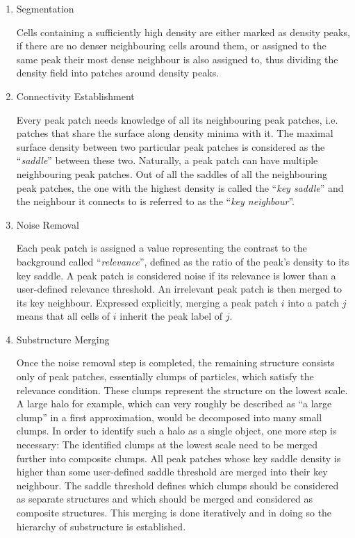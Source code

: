 \begin{enumerate}
	\item Segmentation
	
	Cells containing a sufficiently high density are either marked as density peaks, if there are no denser neighbouring cells around them, or assigned to the same peak their most dense neighbour is also assigned to, thus dividing the density field into patches around density peaks.
	
	
	\item Connectivity Establishment
	
	Every peak patch needs knowledge of all its neighbouring peak patches, i.e. patches that share the surface along density minima with it.
	The maximal surface density between two particular peak patches is considered as the ``\emph{saddle}'' between these two. 
	Naturally, a peak patch can have multiple neighbouring peak patches. 
	Out of all the saddles of all the neighbouring peak patches, the one with the highest density is called the ``\emph{key saddle}'' and the neighbour it connects to is referred to as the ``\emph{key neighbour}''.
	
	
	
	\item Noise Removal
	
	Each peak patch is assigned a value representing the contrast to the background called ``\emph{relevance}'', defined as the ratio of the peak's density to its key saddle. 
	A peak patch is considered noise if its relevance is lower than a user-defined relevance threshold.
	An irrelevant peak patch is then merged to its key neighbour. 
	Expressed explicitly, merging a peak patch $i$ into a patch $j$ means that all cells of $i$ inherit the peak label of $j$.
	
	
	\item Substructure Merging
	
	Once the noise removal step is completed, the remaining structure consists only of peak patches, essentially clumps of particles, which satisfy the relevance condition. 
	These clumps represent the structure on the lowest scale.
	A large halo for example, which can very roughly be described as ``a large clump'' in a first approximation, would be decomposed into many small clumps. In order to identify such a halo as a single object, one more step is necessary:
	The identified clumps at the lowest scale need to be merged further into composite clumps.
	All peak patches whose key saddle density is higher than some user-defined saddle threshold are merged into their key neighbour.
	The saddle threshold defines which clumps should be considered as separate structures and which should be merged and considered as composite structures.
    This merging is done iteratively and in doing so the hierarchy of substructure is established.
	
\end{enumerate}


